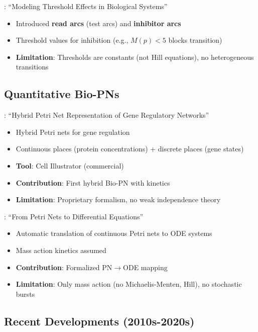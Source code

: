 \textbf{\citet{Koch2011}}: ``Modeling Threshold Effects in Biological Systems''

\begin{itemize}
    \item Introduced \textbf{read arcs} (test arcs) and \textbf{inhibitor arcs}
    \item Threshold values for inhibition (e.g., $M(p) < 5$ blocks transition)
    \item \textbf{Limitation}: Thresholds are constants (not Hill equations), no heterogeneous transitions
\end{itemize}

\subsection{Quantitative Bio-PNs}
\label{subsec:quantitative-bio-pn}

\textbf{\citet{Matsuno2003}}: ``Hybrid Petri Net Representation of Gene Regulatory Networks''

\begin{itemize}
    \item Hybrid Petri nets for gene regulation
    \item Continuous places (protein concentrations) + discrete places (gene states)
    \item \textbf{Tool}: Cell Illustrator (commercial)
    \item \textbf{Contribution}: First hybrid Bio-PN with kinetics
    \item \textbf{Limitation}: Proprietary formalism, no weak independence theory
\end{itemize}

\textbf{\citet{Gilbert2006}}: ``From Petri Nets to Differential Equations''

\begin{itemize}
    \item Automatic translation of continuous Petri nets to ODE systems
    \item Mass action kinetics assumed
    \item \textbf{Contribution}: Formalized PN$\to$ODE mapping
    \item \textbf{Limitation}: Only mass action (no Michaelis-Menten, Hill), no stochastic bursts
\end{itemize}

\subsection{Recent Developments (2010s-2020s)}
\label{subsec:recent-bio-pn}

